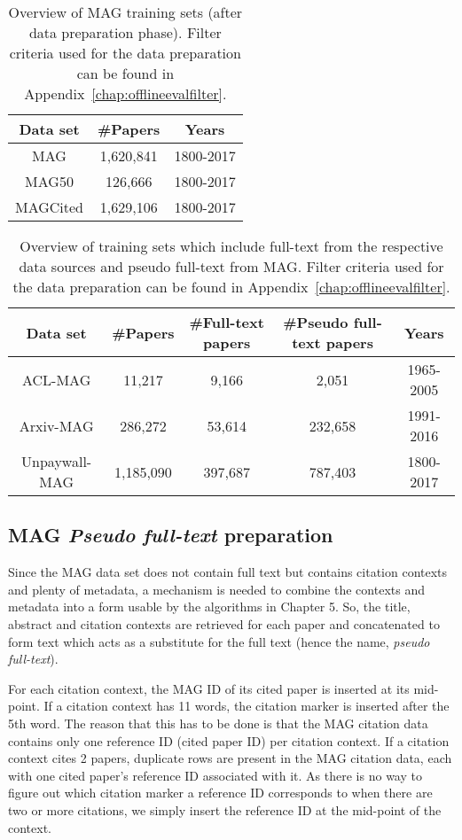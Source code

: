 \begin{table}
\centering
    \begin{tabular}{ccc}
    \toprule
    Data set & \#Papers & Years \\
    \midrule
       MAG & 1,620,841 & 1800-2017 \\
       MAG50 & 126,666 & 1800-2017 \\
       MAGCited & 1,629,106 & 1800-2017\\
    \bottomrule
    \end{tabular}
    \caption{Overview of MAG training sets (after data preparation phase). Filter criteria used for the data preparation can be found in Appendix~\ref{chap:offlineevalfilter}.}
    \label{tab:MAGdatasets}
\end{table}

\begin{table}[]
    \centering
    \begin{tabular}{ccccc}
    \toprule
    Data set & \#Papers & \#Full-text papers & \#Pseudo full-text papers & Years \\
    \midrule
        ACL-MAG & 11,217 & 9,166 & 2,051 & 1965-2005 \\
        Arxiv-MAG & 286,272 & 53,614 & 232,658 & 1991-2016 \\
        Unpaywall-MAG & 1,185,090 & 397,687 & 787,403 & 1800-2017\\
        \bottomrule
    \end{tabular}
    \caption{Overview of training sets which include full-text from the respective data sources and pseudo full-text from MAG. Filter criteria used for the data preparation can be found in Appendix~\ref{chap:offlineevalfilter}.}
    \label{tab:nonmagdatasets}
\end{table}

\subsection{MAG \textit{Pseudo full-text} preparation}
Since the MAG data set does not contain full text but contains citation contexts and plenty of metadata, a mechanism is needed to combine the contexts and metadata into a form usable by the algorithms in Chapter 5. So, the title, abstract and citation contexts are retrieved for each paper and concatenated to form text which acts as a substitute for the full text (hence the name, \textit{pseudo full-text}). 

For each citation context, the MAG ID of its cited paper is inserted at its mid-point. If a citation context has 11 words, the citation marker is inserted after the 5th word. The reason that this has to be done is that the MAG citation data contains only one reference ID (cited paper ID) per citation context. If a citation context cites 2 papers, duplicate rows are present in the MAG citation data, each with one cited paper's reference ID associated with it. As there is no way to figure out which citation marker a reference ID corresponds to when there are two or more citations, we simply insert the reference ID at the mid-point of the context. 

